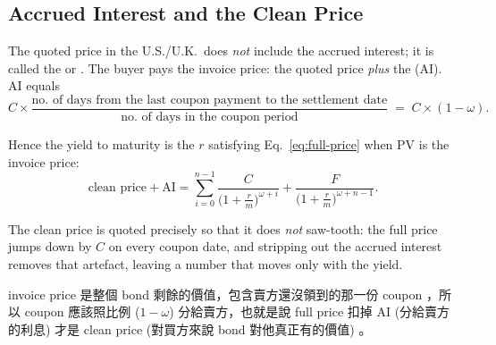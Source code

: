 \subsection{Accrued Interest and the Clean Price}

The quoted price in the U.S./U.K.\ does \emph{not} include the accrued interest; it is called the  or .
The buyer pays the invoice price: the quoted price \emph{plus} the  (AI).
AI equals
\[
	C \times
	\frac{\text{no.\ of days from the last coupon payment to the settlement date}}
	{\text{no.\ of days in the coupon period}}
	\;=\; C \times (1-\omega) .
\]

Hence the yield to maturity is the $r$ satisfying Eq.~\eqref{eq:full-price} when PV is the invoice price:
\[
	\text{clean price} + \mathrm{AI}
	= \sum_{i=0}^{n-1} \frac{C}{\bigl(1+\frac{r}{m}\bigr)^{\omega+i}}
	+ \frac{F}{\bigl(1+\frac{r}{m}\bigr)^{\omega+n-1}} .
\]

\suppstart
\begin{intuition}
	The clean price is quoted precisely so that it does \emph{not} saw-tooth: the full price jumps down by $C$ on every coupon date, and stripping out the accrued interest removes that artefact, leaving a number that moves only with the yield.
\end{intuition}

\begin{remark}
    invoice price 是整個 bond 剩餘的價值，包含賣方還沒領到的那一份 coupon ，所以 coupon 應該照比例 (\(1 - \omega \)) 分給賣方，也就是說 full price 扣掉 AI (分給賣方的利息) 才是 clean price (對買方來說 bond 對他真正有的價值) 。
\end{remark}


